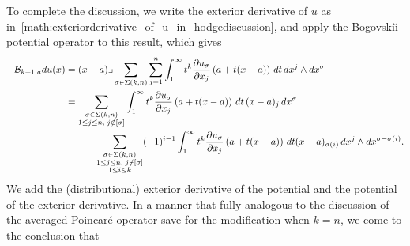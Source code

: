 \documentclass[10pt,a4paper]{article}
\begin{document}
To complete the discussion, we write the exterior derivative of $u$ as in~\eqref{math:exteriorderivative_of_u_in_hodgediscussion}, 
and apply the Bogovski\u{\i} potential operator to this result, which gives 
\begin{align*}
    - 
    {\mathcal B}_{k+1,a} d u(x)
    &=
    (x-a)\lrcorner 
    \sum_{\sigma \in \Sigma(k,n)} \sum_{j=1}^{n}
    \int_{1}^\infty t^{k} \frac{ \partial u_{\sigma} }{\partial x_{j}}\left(a+t(x-a)\right) \,dt 
    \,dx^{j} \wedge dx^{\sigma}
    \\&
    = 
    \sum_{\substack{ \sigma \in \Sigma(k,n) \\ 1 \leq j \leq n, \; j \notin [\sigma] }} 
    \int_{1}^\infty t^{k} \frac{ \partial u_{\sigma} }{\partial x_{j}}\left(a+t(x-a)\right) \,dt \,(x-a)_{j} \,dx^{\sigma}
    \\&\qquad 
    - 
    \sum_{\substack{ \sigma \in \Sigma(k,n) \\ 1 \leq j \leq n, \; j \notin [\sigma] \\ 1 \leq i \leq k }}
    (-1)^{i-1}
    \int_{1}^\infty t^{k} \frac{ \partial u_{\sigma} }{\partial x_{j}}\left(a+t(x-a)\right) \,dt 
    (x-a)_{\sigma(i)} \,dx^{j} \wedge dx^{\sigma-\sigma(i)}
    .
\end{align*}
We add the (distributional) exterior derivative of the potential and the potential of the exterior derivative.
In a manner that fully analogous to the discussion of the averaged Poincar\'e operator save for the modification when $k=n$, 
we come to the conclusion that 
\end{document}
